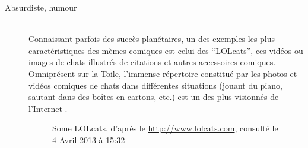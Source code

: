 \begin{description}

\item[Absurdiste, humour]
\hfill \\
Connaissant parfois des succès planétaires, un des exemples les plus caractéristiques des mèmes comiques est celui des {\textquotedblleft}LOLcats{\textquotedblright}, ces vidéos ou images de chats illustrés de citations et autres accessoires comiques. Omniprésent sur la Toile, l{\textquoteright}immense répertoire constitué par les photos et vidéos comiques de chats dans différentes situations (jouant du piano, sautant dans des bo\^ites en cartons, etc.) est un des plus visionnés de l{\textquoteright}Internet \citep{Bauckhage2011}.

\begin{figure}[htpb]
    \centering
    
    \caption[Some LOLcats]{Some LOLcats, d{\textquoteright}après le \url{http://www.lolcats.com}, consulté le 4 Avril 2013 à 15:32}
    \label{fig:lolcats}
\end{figure}




\end{description}
